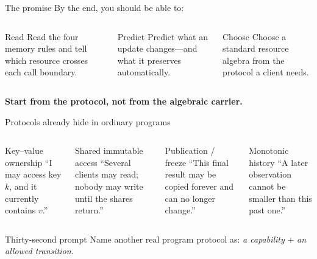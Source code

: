 \documentclass[aspectratio=169,10pt]{beamer}
\begin{document}
\begin{frame}{The promise}
  By the end, you should be able to:

  \vspace{0.3cm}
  \begin{columns}[T,onlytextwidth]
      \begin{block}{Read}
        Read the four memory rules and tell which resource crosses each call boundary.
      \end{block}
      \begin{block}{Predict}
        Predict what an update changes---and what it preserves automatically.
      \end{block}
      \begin{block}{Choose}
        Choose a standard resource algebra from the protocol a client needs.
      \end{block}
  \end{columns}

  \vspace{0.55cm}
  \begin{center}
    \Large\bfseries\color{CrisNavy}
    Start from the protocol, not from the algebraic carrier.
  \end{center}
\end{frame}

\begin{frame}{Protocols already hide in ordinary programs}
  \begin{columns}[T,onlytextwidth]
      \begin{block}{Key--value ownership}
        “I may access key \(k\), and it currently contains \(v\).”
      \end{block}
      \begin{block}{Shared immutable access}
        “Several clients may read; nobody may write until the shares return.”
      \end{block}
      \begin{block}{Publication / freeze}
        “This final result may be copied forever and can no longer change.”
      \end{block}
      \begin{block}{Monotonic history}
        “A later observation cannot be smaller than this past one.”
      \end{block}
  \end{columns}

  \vspace{0.25cm}
  \begin{exampleblock}{Thirty-second prompt}
    Name another real program protocol as: \emph{a capability} + \emph{an allowed transition}.
  \end{exampleblock}
\end{frame}
\end{document}
